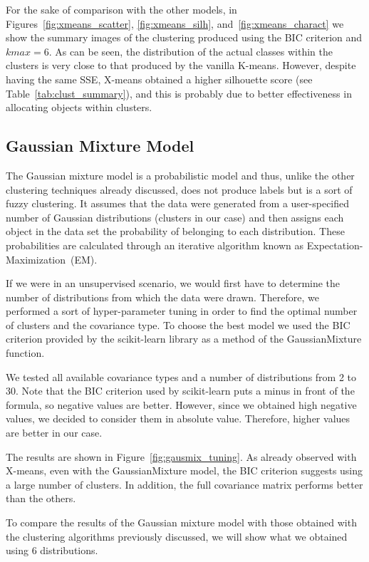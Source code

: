 \documentclass[10pt, a4paper, twocolumn]{article}
\begin{document}
For the sake of comparison with the other models, in Figures~\ref{fig:xmeans_scatter}, \ref{fig:xmeans_silh}, and~\ref{fig:xmeans_charact} we show the summary images of the clustering produced using the BIC criterion and $kmax=6$. As can be seen, the distribution of the actual classes within the clusters is very close to that produced by the vanilla K-means. However, despite having the same SSE, X-means obtained a higher silhouette score (see Table~\ref{tab:clust_summary}), and this is probably due to better effectiveness in allocating objects within clusters.

\subsection*{Gaussian Mixture Model}

The Gaussian mixture model is a probabilistic model and thus, unlike the other clustering techniques already discussed, does not produce labels but is a sort of fuzzy clustering. It assumes that the data were generated from a user-specified number of Gaussian distributions (clusters in our case) and then assigns each object in the data set the probability of belonging to each distribution. These probabilities are calculated through an iterative algorithm known as Expectation-Maximization~(EM).

If we were in an unsupervised scenario, we would first have to determine the number of distributions from which the data were drawn. Therefore, we performed a sort of hyper-parameter tuning in order to find the optimal number of clusters and the covariance type. To choose the best model we used the BIC criterion provided by the scikit-learn library as a method of the GaussianMixture function.  

We tested all available covariance types and a number of distributions from 2 to 30. Note that the BIC criterion used by scikit-learn puts a minus in front of the formula, so negative values are better. However, since we obtained high negative values, we decided to consider them in absolute value. Therefore, higher values are better in our case.

The results are shown in Figure~\ref{fig:gausmix_tuning}. As already observed with X-means, even with the GaussianMixture model, the BIC criterion suggests using a large number of clusters. In addition, the full covariance matrix performs better than the others. 

To compare the results of the Gaussian mixture model with those obtained with the clustering algorithms previously discussed, we will show what we obtained using 6 distributions. 
\end{document}
